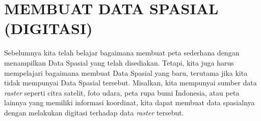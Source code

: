 \chapter{MEMBUAT DATA SPASIAL (DIGITASI)}

Sebelumnya kita telah belajar bagaimana membuat peta sederhana dengan menampilkan Data Spasial yang telah disediakan. Tetapi, kita juga harus mempelajari bagaimana membuat Data Spasial yang baru, terutama jika kita tidak mempunyai Data Spasial tersebut. Misalkan, kita mempunyai sumber data \textit{raster} seperti citra satelit, foto udara, peta rupa bumi Indonesia, atau peta lainnya yang memiliki informasi koordinat, kita dapat membuat data spasialnya dengan melakukan digitasi terhadap data \textit{raster} tersebut.

